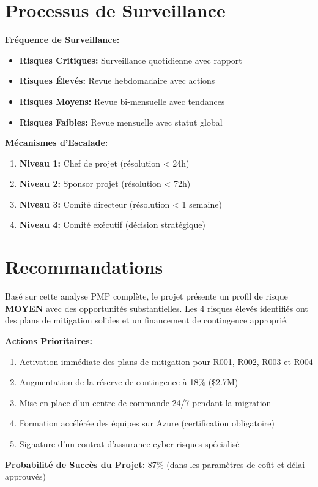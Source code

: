 \documentclass{TemplatesParametriques/dollarama}
\begin{document}

\section{Processus de Surveillance}

\textbf{Fréquence de Surveillance:}
\begin{itemize}
    \item \textbf{Risques Critiques:} Surveillance quotidienne avec rapport
    \item \textbf{Risques Élevés:} Revue hebdomadaire avec actions
    \item \textbf{Risques Moyens:} Revue bi-mensuelle avec tendances
    \item \textbf{Risques Faibles:} Revue mensuelle avec statut global
\end{itemize}

\textbf{Mécanismes d'Escalade:}
\begin{enumerate}
    \item \textbf{Niveau 1:} Chef de projet (résolution < 24h)
    \item \textbf{Niveau 2:} Sponsor projet (résolution < 72h)
    \item \textbf{Niveau 3:} Comité directeur (résolution < 1 semaine)
    \item \textbf{Niveau 4:} Comité exécutif (décision stratégique)
\end{enumerate}


\section{Recommandations}

Basé sur cette analyse PMP complète, le projet présente un profil de risque \textbf{MOYEN} avec des opportunités substantielles. Les 4 risques élevés identifiés ont des plans de mitigation solides et un financement de contingence approprié.

\textbf{Actions Prioritaires:}
\begin{enumerate}
    \item Activation immédiate des plans de mitigation pour R001, R002, R003 et R004
    \item Augmentation de la réserve de contingence à 18\% (\$2.7M)
    \item Mise en place d'un centre de commande 24/7 pendant la migration
    \item Formation accélérée des équipes sur Azure (certification obligatoire)
    \item Signature d'un contrat d'assurance cyber-risques spécialisé
\end{enumerate}


\textbf{Probabilité de Succès du Projet:} 87\% (dans les paramètres de coût et délai approuvés)
\end{document}
